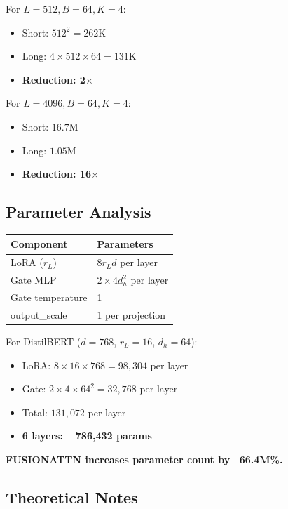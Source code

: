 For $L = 512, B = 64, K = 4$:

\begin{itemize}
\item Short: $512^2 = 262$K
\item Long: $4 \times 512 \times 64 = 131$K
\item \textbf{Reduction: 2$\times$}

\end{itemize}
For $L = 4096, B = 64, K = 4$:

\begin{itemize}
\item Short: $16.7$M
\item Long: $1.05$M
\item \textbf{Reduction: 16$\times$}

\end{itemize}
\subsection{Parameter Analysis}

\begin{table}[H]
\centering
\small
\begin{tabular}{ll}
\toprule
\textbf{Component} & \textbf{Parameters} \\
\midrule
LoRA ($r_L$) & $8 r_L d$ per layer \\
Gate MLP & $2 \times 4 d_h^2$ per layer \\
Gate temperature & 1 \\
output\_scale & 1 per projection \\
\bottomrule
\end{tabular}
\end{table}

For DistilBERT ($d=768$, $r_L=16$, $d_h=64$):

\begin{itemize}
\item LoRA: $8 \times 16 \times 768 = 98{,}304$ per layer
\item Gate: $2 \times 4 \times 64^2 = 32{,}768$ per layer
\item Total: $131{,}072$ per layer
\item \textbf{6 layers: +786,432 params}

\end{itemize}
\textbf{FUSIONATTN increases parameter count by ~66.4M\%.}

\subsection{Theoretical Notes}

